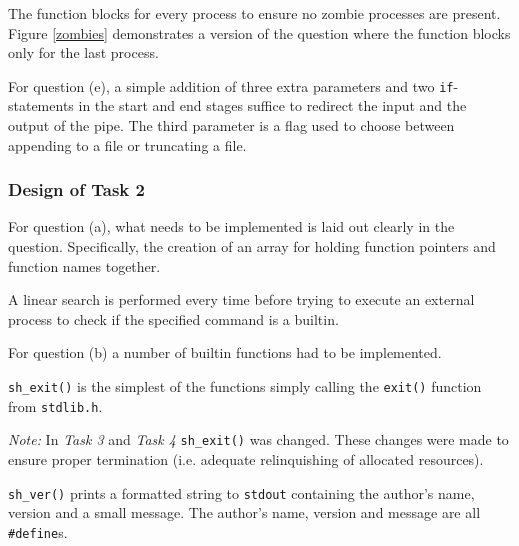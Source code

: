 \documentclass[12pt]{article}
\begin{document}
The function blocks for every process to ensure no zombie
processes are present. Figure \ref{zombies} demonstrates a
version of the question where the function blocks only for the
last process.

\newpage





For question (e), a simple addition of three extra parameters
and two \texttt{if}-statements in the start and end stages
suffice to redirect the input and the output of the pipe. The
third parameter is a flag used to choose between appending to a
file or truncating a file.

\subsubsection{Design of Task 2}



For question (a), what needs to be implemented is laid out
clearly in the question. Specifically, the creation of an array
for holding function pointers and function names together. 



A linear search is performed every time before trying to execute
an external process to check if the specified command is a
builtin.

For question (b) a number of builtin functions had to be
implemented.

\texttt{sh\_exit()} is the simplest of the functions simply
calling the \texttt{exit()} function from \texttt{stdlib.h}.

\textit{Note:} In \textit{Task 3} and \textit{Task 4}
\texttt{sh\_exit()} was changed. These changes were made to
ensure proper termination (i.e. adequate relinquishing of
allocated resources).



\texttt{sh\_ver()} prints a formatted string to \texttt{stdout}
containing the author's name, version and a small message. The
author's name, version and message are all \texttt{\#define}s.
\end{document}
